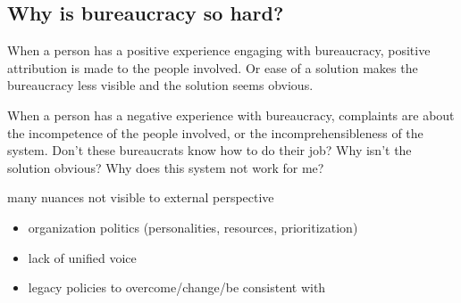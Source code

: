 \subsection{Why is bureaucracy so hard?}

When a person has a positive experience engaging with bureaucracy, positive attribution is made to the people involved. Or ease of a solution makes the bureaucracy less visible and the solution seems obvious. 

When a person has a negative experience with bureaucracy, complaints are about the incompetence of the people involved, or the incomprehensibleness of the system. Don't these bureaucrats know how to do their job? Why isn't the solution obvious? Why does this system not work for me?

many nuances not visible to external perspective
\begin{itemize}
    \item organization politics (personalities, resources, prioritization)
\item lack of unified voice
\item legacy policies to overcome/change/be consistent with
\end{itemize}



